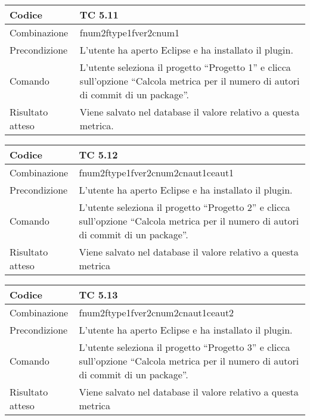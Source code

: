 \begin{table}[ht]
\begin{tabular}{|p{3cm}|p{9cm}|}
\hline
\cellcolor{lightgray}Codice				& TC 5.11								\\
\hline
\cellcolor{lightgray}Combinazione		& fnum2ftype1fver2cnum1									\\
\hline
\cellcolor{lightgray}Precondizione		& L'utente ha aperto Eclipse e ha installato il plugin.		\\
\hline
\cellcolor{lightgray}Comando			& L'utente seleziona il progetto ``Progetto 1''  e clicca sull'opzione ``Calcola metrica per il numero di autori di commit di un package''.	\\
\hline
\cellcolor{lightgray}Risultato atteso	& Viene salvato nel database il valore relativo a questa metrica.\\
\hline
\end{tabular}
\end{table}

\begin{table}[ht]
\begin{tabular}{|p{3cm}|p{9cm}|}
\hline
\cellcolor{lightgray}Codice				& TC 5.12								\\
\hline
\cellcolor{lightgray}Combinazione		& fnum2ftype1fver2cnum2cnaut1ceaut1 									\\
\hline
\cellcolor{lightgray}Precondizione		& L'utente ha aperto Eclipse e ha installato il plugin.				\\
\hline
\cellcolor{lightgray}Comando			& L'utente seleziona il progetto ``Progetto 2''  e clicca sull'opzione ``Calcola metrica per il numero di autori di commit di un package''.	\\
\hline
\cellcolor{lightgray}Risultato atteso	& Viene salvato nel database il valore relativo a questa metrica	\\
\hline
\end{tabular}
\end{table}

\begin{table}[ht]
\begin{tabular}{|p{3cm}|p{9cm}|}
\hline
\cellcolor{lightgray}Codice				& TC 5.13								\\
\hline
\cellcolor{lightgray}Combinazione		& fnum2ftype1fver2cnum2cnaut1ceaut2									\\
\hline
\cellcolor{lightgray}Precondizione		& L'utente ha aperto Eclipse e ha installato il plugin.					\\
\hline
\cellcolor{lightgray}Comando			& L'utente seleziona il progetto ``Progetto 3''  e clicca sull'opzione ``Calcola metrica per il numero di autori di commit di un package''.	\\
\hline
\cellcolor{lightgray}Risultato atteso	& Viene salvato nel database il valore relativo a questa metrica	\\
\hline
\end{tabular}
\end{table}

